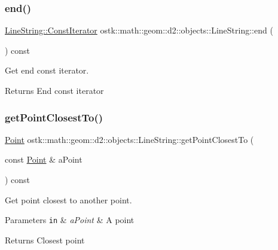 \subsubsection{\texorpdfstring{end()}{end()}}
{\footnotesize\ttfamily \hyperlink{classostk_1_1math_1_1geom_1_1d2_1_1objects_1_1_line_string_a29e6326c716bef2ec438534cfdc1e118}{Line\+String\+::\+Const\+Iterator} ostk\+::math\+::geom\+::d2\+::objects\+::\+Line\+String\+::end (\begin{DoxyParamCaption}{ }\end{DoxyParamCaption}) const}



Get end const iterator. 

\begin{DoxyReturn}{Returns}
End const iterator 
\end{DoxyReturn}
\mbox{\label{classostk_1_1math_1_1geom_1_1d2_1_1objects_1_1_line_string_adba8e8498cade7e10b4df301b0215d8e}} 
\subsubsection{\texorpdfstring{get\+Point\+Closest\+To()}{getPointClosestTo()}}
{\footnotesize\ttfamily \hyperlink{classostk_1_1math_1_1geom_1_1d2_1_1objects_1_1_point}{Point} ostk\+::math\+::geom\+::d2\+::objects\+::\+Line\+String\+::get\+Point\+Closest\+To (\begin{DoxyParamCaption}\item[{const \hyperlink{classostk_1_1math_1_1geom_1_1d2_1_1objects_1_1_point}{Point} \&}]{a\+Point }\end{DoxyParamCaption}) const}



Get point closest to another point. 


\begin{DoxyParams}[1]{Parameters}
\mbox{\tt in}  & {\em a\+Point} & A point \\
\hline
\end{DoxyParams}
\begin{DoxyReturn}{Returns}
Closest point 
\end{DoxyReturn}
\mbox{\label{classostk_1_1math_1_1geom_1_1d2_1_1objects_1_1_line_string_af4a7c10fc43a4facff65280e23217ec4}} 
